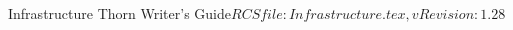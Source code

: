 \begin{cactuspart}{4}{Infrastructure Thorn Writer's Guide}{$RCSfile: Infrastructure.tex,v $}{$Revision: 1.28 $}
\begin{Lentry}
\end{Lentry}



\end{cactuspart}
